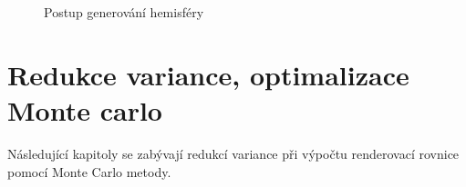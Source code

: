 \documentclass[czech,master,dept460,male,cpp,cpdeclaration]{diploma}
\begin{document}
\begin{figure}[ht]
    \qquad
    \caption{Postup generování hemisféry}%
    \label{fig:hemisfera}%
\end{figure}


\clearpage
\section{Redukce variance, optimalizace Monte carlo}
Následující kapitoly se zabývají redukcí variance při výpočtu renderovací rovnice pomocí Monte Carlo metody.
\end{document}

